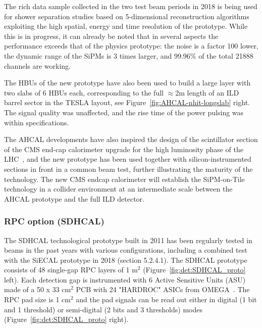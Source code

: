 %
%
The rich data sample collected in the two test beam periods in 2018  is being used for shower separation studies based on 5-dimensional reconstruction algorithms exploiting the high spatial, energy and time resolution of the prototype. 
While this is in progress, it can already be noted that in several aspects the  performance exceeds that of the physics prototype: the noise is a factor 100 lower, the dynamic range of the SiPMs is 3 times larger, and 99.96\% of the total 21888 channels are working.

The HBUs of the new prototype have also been used to build a large layer with two slabs of 6 HBUs each, corresponding to the full $\approx$2m length of an ILD barrel sector in the TESLA layout, see Figure~\ref{fig:AHCAL-nhit-longslab} right. The signal quality was unaffected, and the rise time of the power pulsing was within specifications. 

The AHCAL developments have also inspired the design of the scintillator section of the CMS end-cap calorimeter upgrade for the high luminosity phase of the LHC~\cite{Collaboration:2293646}, and the new prototype has been used together with silicon-instrumented sections in front in a common beam test, further illustrating the maturity of the technology. 
The new CMS endcap calorimeter will establish the SiPM-on-Tile technology in a collider environment at an intermediate scale between the AHCAL prototype and the full ILD detector. 

\subsubsection{RPC option (SDHCAL)}
\label{ild:sec:hcal:sdhcal}
The SDHCAL technological prototype built in 2011 has been regularly tested in beams in the past years with various configurations, including a combined test with the SiECAL prototype in 2018 (section 5.2.4.1). The SDHCAL prototype consists of 48 single-gap RPC layers of 1 m$^2$ (Figure~\ref{fig:det:SDHCAL_proto} left). Each detection gap is instrumented with 6 Active Sensitive Units (ASU) made of a  50 x 33 cm$^2$ PCB with 24 "HARDROC" ASICs from OMEGA~\cite{Callier:2014uqa}. The RPC pad size is 1 cm$^2$ and the pad signals can be read out either in digital (1 bit and 1 threshold) or semi-digital (2 bits and 3 thresholds) modes (Figure~\ref{fig:det:SDHCAL_proto} right).

